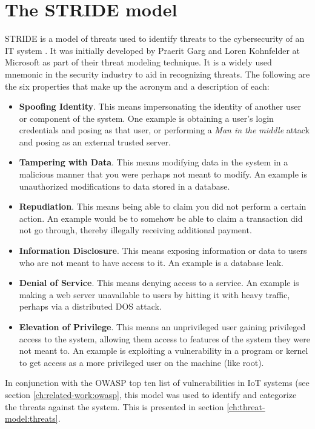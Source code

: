 \section{The STRIDE model} \label{ch:method:stride}
STRIDE is a model of threats used to identify threats to the cybersecurity of an IT system \cite{stride}. It was initially developed by Praerit Garg and Loren Kohnfelder at Microsoft as part of their threat modeling technique. It is a widely used mnemonic in the security industry to aid in recognizing threats. The following are the six properties that make up the acronym and a description of each:
\begin{itemize}
    \item \textbf{Spoofing Identity}. This means impersonating the identity of another user or component of the system. One example is obtaining a user's login credentials and posing as that user, or performing a \textit{Man in the middle} attack and posing as an external trusted server.
    \item \textbf{Tampering with Data}. This means modifying data in the system in a malicious manner that you were perhaps not meant to modify. An example is unauthorized modifications to data stored in a database.
    \item \textbf{Repudiation}. This means being able to claim you did not perform a certain action. An example would be to somehow be able to claim a transaction did not go through, thereby illegally receiving additional payment.
    \item \textbf{Information Disclosure}. This means exposing information or data to users who are not meant to have access to it. An example is a database leak.
    \item \textbf{Denial of Service}. This means denying access to a service. An example is making a web server unavailable to users by hitting it with heavy traffic, perhaps via a distributed \gls{DOS} attack.
    \item \textbf{Elevation of Privilege}. This means an unprivileged user gaining privileged access to the system, allowing them access to features of the system they were not meant to. An example is exploiting a vulnerability in a program or kernel to get access as a more privileged user on the machine (like root).
\end{itemize}
In conjunction with the OWASP top ten list of vulnerabilities in IoT systems (see section \ref{ch:related-work:owasp}, this model was used to identify and categorize the threats against the system. This is presented in section \ref{ch:threat-model:threats}.
